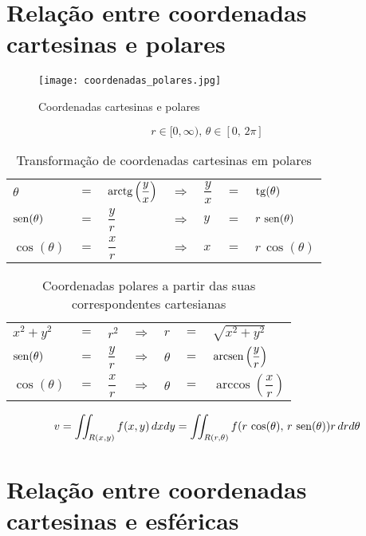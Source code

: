 \section{Relação entre coordenadas cartesinas e polares}
	\begin{figure}[H]
		\caption{Coordenadas cartesinas e polares}
		\label{coordenadas_cartesianas_polares}
		\centering
		\texttt{[image: coordenadas\_polares.jpg]}		
	\end{figure}
		
	$$r \in [0, \infty),\, \theta \in [0,\, 2\pi]$$
	
	\begin{table}[H]
		\caption{Transformação de coordenadas cartesinas em polares}
		\label{transformacao_coordenadas_cartesianas_polares}
		\centering		
		\begin{tabular}{|lclclcl|}
			$\theta$       & $=$ & $\operatorname{arctg}\left(\dfrac{y}{x}\right)$ & $\Rightarrow$ & $\dfrac{y}{x}$ & $=$ & $\operatorname{tg}(\theta)$     \\
			$\operatorname{sen}(\theta)$ & $=$ & $\dfrac{y}{r}$                    & $\Rightarrow$ & $y$            & $=$ & $r\,\operatorname{sen}(\theta)$ \\
			$\cos(\theta)$ & $=$ & $\dfrac{x}{r}$                    & $\Rightarrow$ & $x$            & $=$ & $r\,\cos(\theta)$
		\end{tabular}		
	\end{table}
	\begin{table}[H]
		\caption{Coordenadas polares a partir das suas correspondentes cartesianas}
		\label{correpondentes_coordenadas_cartesianas_polares}
		\centering		
		\begin{tabular}{|lclclcl|}
			$x^2 + y^2$    & $=$ & $r^2$          & $\Rightarrow$ & $r$      & $=$ & $\sqrt{x^2 + y^2}$                 \\
			$\operatorname{sen}(\theta)$ & $=$ & $\dfrac{y}{r}$ & $\Rightarrow$ & $\theta$ & $=$ & $\operatorname{arcsen}\left(\dfrac{y}{r}\right)$ \\
			$\cos(\theta)$ & $=$ & $\dfrac{x}{r}$ & $\Rightarrow$ & $\theta$ & $=$ & $\arccos\left(\dfrac{x}{r}\right)$
		\end{tabular}		
	\end{table}
	
	\begin{equation*}
		v = \iint_{R(x,y)} f(x,y)\, dxdy = \iint_{R(r,\theta)} f(r\,\cos(\theta),\,r\,\operatorname{sen}(\theta)) r\,drd\theta
	\end{equation*}
	
\section{Relação entre coordenadas cartesinas e esféricas}
	
